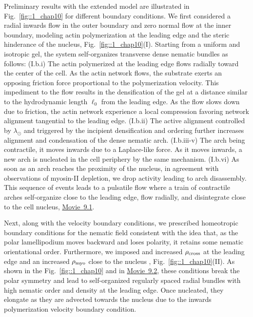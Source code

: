 Preliminary results with the extended model are illustrated in Fig.~\ref{fig::1_chap10} for different boundary conditions. We first considered a radial inwards flow in the outer boundary and zero normal flow at the inner boundary, modeling actin polymerization at the leading edge and the steric hinderance of the nucleus, Fig.~\ref{fig::1_chap10}(I). Starting from a uniform and isotropic gel, the system self-organizes transverse dense nematic bundles as follows: (I.b.i) The actin polymerized at the leading edge flows radially toward the center of the cell. As the actin network flows, the substrate exerts an opposing friction force proportional to the polymerization velocity. This impediment to the flow results in the densification of the gel at a distance similar to the hydrodynamic length $\ell_0$ from the leading edge. As the flow slows down due to friction, the actin network experience a local compression favoring network alignment tangential to the leading edge. (I.b.ii) The active alignment controlled by $\lambda_\odot$ and triggered by the incipient densification and ordering further increases alignment and condensation of the dense nematic arch. (I.b.iii-v) The arch being contractile, it moves inwards due to a Laplace-like force. As it moves inwards, a new arch is nucleated in the cell periphery by the same mechanism. (I.b.vi) As soon as an arch reaches the proximity of the nucleus, in agreement with observations of myosin-II depletion, we drop activity leading to arch disassembly. This sequence of events leads to a  pulsatile flow where a train of contractile arches self-organize close to the leading edge, flow radially, and disintegrate close to the cell nucleus,  \href{https://github.com/waleedmirzaPhD/movies_thesis.git}{Movie~9.1}.



Next, along with the velocity boundary conditions, we prescribed homeotropic boundary conditions for the nematic field consistent with the idea that, as the polar lamellipodium moves backward and loses polarity, it retains some nematic orientational order. Furthermore, we imposed and increased $\rho_{\rm cross}$ at the leading edge and an increased $\rho_{\rm myo}$ close to the nucleus \cite{tee2015, lehtimaki2021}, Fig.~\ref{fig::1_chap10}(II). As shown in the Fig.~\ref{fig::1_chap10} and in  \href{https://github.com/waleedmirzaPhD/movies_thesis.git}{Movie~9.2}, these conditions break the polar symmetry and lead to self-organized regularly spaced radial bundles with high nematic order and density at the leading edge. Once nucleated, they elongate as they are advected towards the nucleus due to the inwards polymerization velocity boundary condition.

